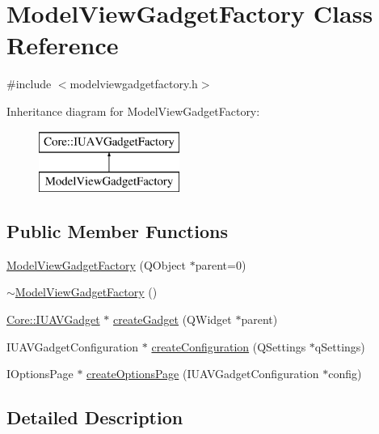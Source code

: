 \hypertarget{class_model_view_gadget_factory}{\section{\-Model\-View\-Gadget\-Factory \-Class \-Reference}
\label{class_model_view_gadget_factory}
}


{\ttfamily \#include $<$modelviewgadgetfactory.\-h$>$}

\-Inheritance diagram for \-Model\-View\-Gadget\-Factory\-:\begin{figure}[H]
\begin{center}
\leavevmode
\includegraphics[height=2.000000cm]{class_model_view_gadget_factory}
\end{center}
\end{figure}
\subsection*{\-Public \-Member \-Functions}
\begin{DoxyCompactItemize}
\item 
\hyperlink{group___model_view_plugin_gab4ca362258332f3214c66cc63ba54d77}{\-Model\-View\-Gadget\-Factory} (\-Q\-Object $\ast$parent=0)
\item 
\hyperlink{group___model_view_plugin_ga7bdf383eb25b1a5226f036371be723b5}{$\sim$\-Model\-View\-Gadget\-Factory} ()
\item 
\hyperlink{class_core_1_1_i_u_a_v_gadget}{\-Core\-::\-I\-U\-A\-V\-Gadget} $\ast$ \hyperlink{group___model_view_plugin_ga10c8c524e828527192c4821b769ab1fe}{create\-Gadget} (\-Q\-Widget $\ast$parent)
\item 
\-I\-U\-A\-V\-Gadget\-Configuration $\ast$ \hyperlink{group___model_view_plugin_gaa2d13e8c20201017fc03b9ffd781247c}{create\-Configuration} (\-Q\-Settings $\ast$q\-Settings)
\item 
\-I\-Options\-Page $\ast$ \hyperlink{group___model_view_plugin_gacccb2300c14739970fbef9a38365c070}{create\-Options\-Page} (\-I\-U\-A\-V\-Gadget\-Configuration $\ast$config)
\end{DoxyCompactItemize}


\subsection{\-Detailed \-Description}


